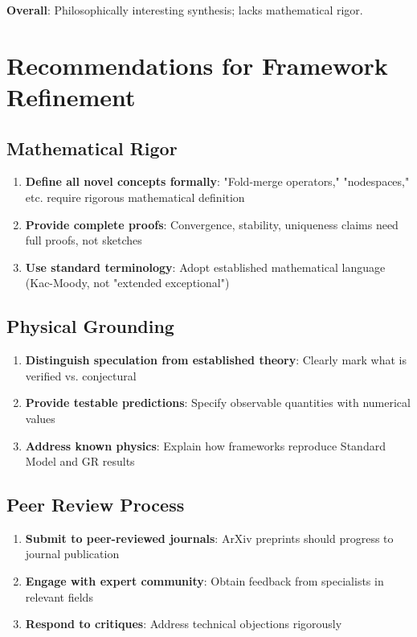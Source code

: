 \textbf{Overall}: Philosophically interesting synthesis; lacks mathematical rigor.

\section{Recommendations for Framework Refinement}

\subsection{Mathematical Rigor}

\begin{enumerate}
    \item \textbf{Define all novel concepts formally}: "Fold-merge operators," "nodespaces," etc. require rigorous mathematical definition
    \item \textbf{Provide complete proofs}: Convergence, stability, uniqueness claims need full proofs, not sketches
    \item \textbf{Use standard terminology}: Adopt established mathematical language (Kac-Moody, not "extended exceptional")
\end{enumerate}

\subsection{Physical Grounding}

\begin{enumerate}
    \item \textbf{Distinguish speculation from established theory}: Clearly mark what is verified vs. conjectural
    \item \textbf{Provide testable predictions}: Specify observable quantities with numerical values
    \item \textbf{Address known physics}: Explain how frameworks reproduce Standard Model and GR results
\end{enumerate}

\subsection{Peer Review Process}

\begin{enumerate}
    \item \textbf{Submit to peer-reviewed journals}: ArXiv preprints should progress to journal publication
    \item \textbf{Engage with expert community}: Obtain feedback from specialists in relevant fields
    \item \textbf{Respond to critiques}: Address technical objections rigorously
\end{enumerate}

